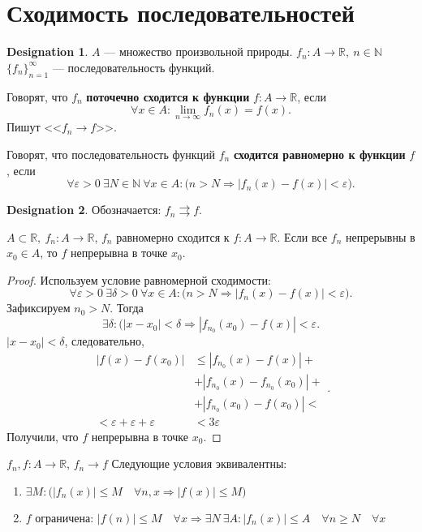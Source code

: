 \documentclass[11pt]{book}
\newcommand{\N}{\mathbb{N}}
\newcommand{\R}{\mathbb{R}}
\renewcommand{\le}{\leqslant}
\renewcommand{\ge}{\geqslant}
\theoremstyle{definition}
\theoremstyle{plain}
\theoremstyle{plain}
\theoremstyle{definition}
\newtheorem*{name}{Designation}
\theoremstyle{remark}
\begin{document}
\section{Сходимость последовательностей}
\begin{name}
    $ A$ --- множество произвольной природы.  $ f_n: A \to  \R, ~ n \in \N$
    $ \{f_n\}_{n=1}^{\infty}$ --- последовательность функций.
\end{name}
\begin{defn}
    Говорят, что $ f_n$ {\bf поточечно сходится к функции}  $ f: A \to  \R$, если \[
	\forall x \in A: \lim_{n \to \infty} f_n(x) = f(x)
    .\] 
    Пишут <<$ f_n \to  f$>>.
\end{defn}
\begin{defn}
    Говорят, что последовательность функций $ f_n$ {\bf  сходится равномерно к функции} $ f$, если 
    \[
	\forall \varepsilon >0 ~ \exists N \in \N ~ \forall x \in A: \bigl( n> N \Longrightarrow |f_n(x) - f(x)| < \varepsilon \bigr)
    .\] 
    \begin{name}
        Обозначается: $ f_n \rightrightarrows f$.
    \end{name}
\end{defn}
\begin{thm}
    $ A \subset \R, ~ f_n: A \to  \R$, $ f_n$ равномерно сходится к $ f: A \to \R$. Если все $ f_n$ непрерывны в  $ x_0 \in A$, то $ f$ непрерывна в точке $ x_0$.
\end{thm}
\begin{proof}
    Используем условие равномерной сходимости:
    \[
	\forall  \varepsilon >0 ~ \exists \delta>0 ~ \forall x \in A: \bigl( n > N \Longrightarrow |f_n(x) - f(x) | < \varepsilon \bigr)
    .\] 
    Зафиксируем $ n_0 > N$.
    Тогда 
    \[
	\exists \delta: \bigl(|x-x_0| < \delta \Longrightarrow |f_{n_0}(x_0) - f(x)|< \varepsilon 
    .\] 
    $ |x-x_0| < \delta$, следовательно, 
    \[
	\begin{aligned}
	    |f(x) - f(x_0)| &\le |f_{n_0}(x) - f(x)| + \\
	    &+ | f_{n_0} (x)- f_{n_0}(x_0)| + \\
	    &+ |f_{n_0}(x_0) - f(x_0)| < \\
	    < \varepsilon + \varepsilon + \varepsilon &<  3 \varepsilon 
	\end{aligned}
    .\] 
    Получили, что $ f$ непрерывна в точке $ x_0$.
\end{proof}
\begin{thm}
    $f_n, f : A \to  \R$, $f_n \to  f$
    Следующие условия эквивалентны:
    \begin{enumerate}
	\item $\exists M : \bigl(|f_n(x)| \le  M \quad \forall  n, x \Longrightarrow  |f(x)| \le  M\bigr)$
	\item $f$ ограничена: $|f(n)| \le  M \quad \forall  x \Longrightarrow   \exists  N ~\exists  A: |f_n(x)| \le A \quad \forall  n \ge  N \quad \forall  x$
    \end{enumerate}
\end{thm}
\end{document}
